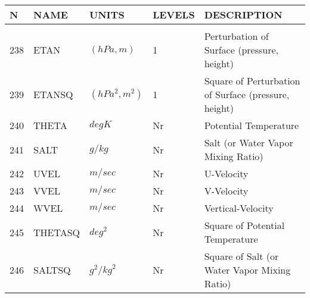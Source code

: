 \vspace{1.5in}
\vfill

\newpage
\vspace*{\fill}
\begin{tabular}{lllll}
\hline\hline
N & NAME & UNITS & LEVELS & DESCRIPTION \\
\hline

&\\
238& ETAN     & $(hPa,m)$ &    1
         &\begin{minipage}[t]{3in}
          {Perturbation of Surface (pressure, height)} 
         \end{minipage}\\
239& ETANSQ   & $(hPa^2,m^2)$ & 1
         &\begin{minipage}[t]{3in}
          {Square of Perturbation of Surface (pressure, height)} 
         \end{minipage}\\
240& THETA    & $deg K$ & Nr
         &\begin{minipage}[t]{3in}
          {Potential Temperature} 
         \end{minipage}\\
241& SALT     & $g/kg$ & Nr
         &\begin{minipage}[t]{3in}
          {Salt (or Water Vapor Mixing Ratio)} 
         \end{minipage}\\
242& UVEL     & $m/sec$ & Nr
         &\begin{minipage}[t]{3in}
          {U-Velocity} 
         \end{minipage}\\
243& VVEL     & $m/sec$ & Nr
         &\begin{minipage}[t]{3in}
          {V-Velocity} 
         \end{minipage}\\
244& WVEL     & $m/sec$ & Nr
         &\begin{minipage}[t]{3in}
          {Vertical-Velocity} 
         \end{minipage}\\
245& THETASQ  & $deg^2$ & Nr
         &\begin{minipage}[t]{3in}
          {Square of Potential Temperature} 
         \end{minipage}\\
246& SALTSQ   & $g^2/{kg}^2$ & Nr
         &\begin{minipage}[t]{3in}
          {Square of Salt (or Water Vapor Mixing Ratio)} 

\end{minipage}
\end{tabular}
